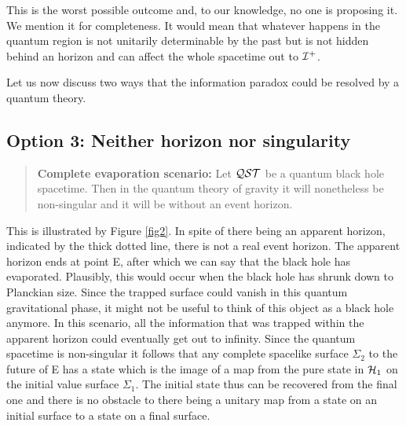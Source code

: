 \documentclass[12pt]{article}
\begin{document}
This is the worst possible outcome and, to our knowledge, no one is proposing it.  We mention it for completeness.  It would mean that whatever happens in the quantum region is not unitarily determinable by the past but is not hidden behind an horizon and  can affect the whole spacetime out to ${\cal I}^+$.  

Let us now discuss two ways that the information paradox could be resolved by a quantum theory.

\subsection*{Option 3: Neither horizon nor singularity}


\begin{quotation}

{\bf Complete evaporation scenario:} Let  ${\cal Q}{\cal S}{\cal T}$ be a quantum  black hole spacetime.  Then in the quantum theory of gravity it will nonetheless be non-singular and it will be without an event horizon.  

\end{quotation}

This is illustrated by Figure \ref{fig2}. In spite of there being an apparent horizon, indicated by the thick dotted line, there is not a 
real event horizon.  The apparent horizon ends at
point E, after which we can say that the black hole has evaporated. Plausibly, this would occur when the black
hole has shrunk down to Planckian size. Since the trapped surface could vanish in this quantum gravitational phase, it
might not be useful to think of this object as a black hole anymore. In this scenario, all the 
information that was trapped within the apparent horizon could eventually 
get out to infinity. Since the quantum spacetime is non-singular it follows that 
any complete spacelike surface $\Sigma_2$ to the future of E
has a state which is the image of a map from the pure state in ${\cal H}_1$ on the initial value surface $\Sigma_1$. The 
initial state thus can be recovered from the final one and there is no obstacle to there being a unitary map from a state on an initial surface to a state on a final surface.
\end{document}
